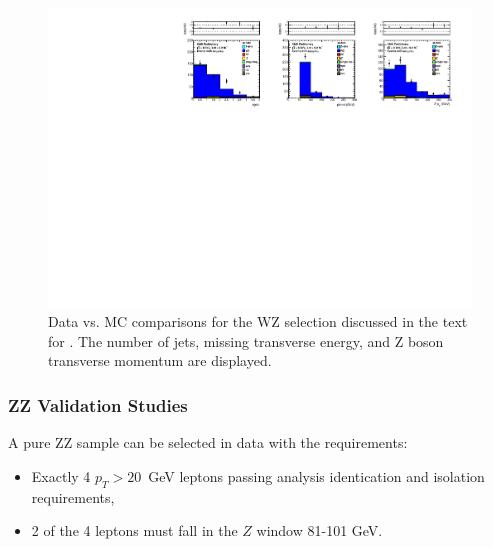 \begin{figure}[tbh]
\begin{center}
\includegraphics[width=1\linewidth]{plots/WZ_92fb.pdf}
\caption{\label{fig:wz}\protect 
Data vs. MC comparisons for the WZ selection discussed in the text for \lumi. 
The number of jets, missing transverse energy, and Z boson transverse momentum are displayed.
}
\end{center}
\end{figure}

\clearpage

\subsubsection{ZZ Validation Studies}
\label{sec:bkg_zz}

A pure ZZ sample can be selected in data with the requirements:

\begin{itemize}
\item Exactly 4 $p_T>20$~GeV leptons passing analysis identication and isolation requirements,
\item 2 of the 4 leptons must fall in the $Z$ window 81-101 GeV.
\end{itemize}

